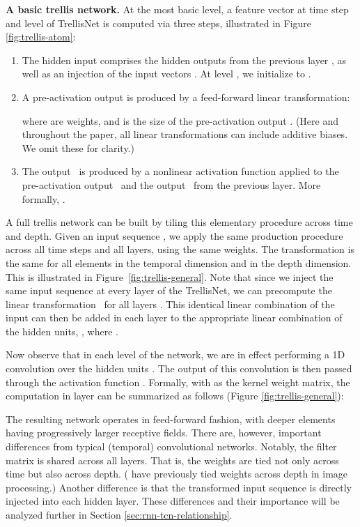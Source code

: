 \documentclass{article} \usepackage{iclr2019_conference,times}
\newcommand\mypara[1]{\vspace{0mm}\noindent\textbf{#1}}
\newcommand{\model}{TrellisNet}
\begin{document}
\mypara{A basic trellis network.}
At the most basic level, a feature vector  at time step  and level  of TrellisNet is computed via three steps, illustrated in Figure \ref{fig:trellis-atom}:
\vspace{-3mm}
\begin{enumerate}[labelsep=*,leftmargin=1pc]
    \item
    The hidden input comprises the hidden outputs  from the previous layer , as well as an injection of the input vectors .
    At level , we initialize to .
    \item
    A pre-activation output  is produced by a feed-forward linear transformation:
    
    where  are weights, and  is the size of the pre-activation output . (Here and throughout the paper, all linear transformations can include additive biases. We omit these for clarity.)
    \item
    The output \small\normalsize~is produced by a nonlinear activation function  applied to the pre-activation output \small\normalsize~and the output \small\normalsize~from the previous layer. More formally, \small\normalsize.
\end{enumerate}

A full trellis network can be built by tiling this elementary procedure across time and depth. Given an input sequence , we apply the same production procedure across all time steps and all layers, using the same weights. The transformation is the same for all elements in the temporal dimension and in the depth dimension. This is illustrated in Figure~\ref{fig:trellis-general}. Note that since we inject the same input sequence at every layer of the \model, we can precompute the linear transformation \small\normalsize~for all layers . This identical linear combination of the input can then be added in each layer  to the appropriate linear combination of the hidden units, \small\normalsize, where \small\normalsize.

Now observe that in each level of the network, we are in effect performing a 1D convolution over the hidden units . The output of this convolution is then passed through the activation function . Formally, with  as the kernel weight matrix, the computation in layer  can be summarized as follows (Figure \ref{fig:trellis-general}):

The resulting network operates in feed-forward fashion, with deeper elements having progressively larger receptive fields. There are, however, important differences from typical (temporal) convolutional networks. Notably, the filter matrix is shared across all layers. That is, the weights are tied not only across time but also across depth. (\cite{vogel2017primal} have previously tied weights across depth in image processing.) Another difference is that the transformed input sequence  is directly injected into each hidden layer. These differences and their importance will be analyzed further in Section \ref{sec:rnn-tcn-relationship}.
\end{document}
